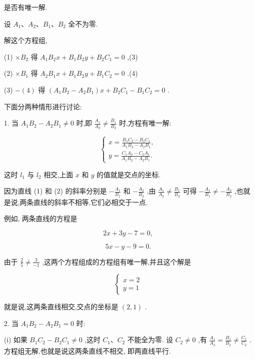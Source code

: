 \documentclass[lang=cn,newtx,10pt,scheme=chinese]{elegantbook}
\begin{document}
是否有唯一解.

设 \({A}_{1}\text{、}{A}_{2}\text{、}{B}_{1}\text{、}{B}_{2}\) 全不为零.

解这个方程组,

(1) \(\times {B}_{2}\) 得 \({A}_{1}{B}_{2}x + {B}_{1}{B}_{2}y + {B}_{2}{C}_{1} = 0\) ,(3)

(2) \(\times {B}_{1}\) 得 \({A}_{2}{B}_{1}x + {B}_{1}{B}_{2}y + {B}_{1}{C}_{2} = 0\) .(4)

(3) \(- \left( 4\right)\) 得 \(\left( {{A}_{1}{B}_{2} - {A}_{2}{B}_{1}}\right) x + {B}_{2}{C}_{1} - {B}_{1}{C}_{2} = 0\) .

下面分两种情形进行讨论:

1. 当 \({A}_{1}{B}_{2} - {A}_{2}{B}_{1} \neq 0\) 时,即 \(\frac{{A}_{1}}{{A}_{2}} \neq \frac{{B}_{1}}{{B}_{2}}\) 时,方程有唯一解:

\[
  \left\{ \begin{array}{l} x = \frac{{B}_{1}{C}_{2} - {B}_{2}{C}_{1}}{{A}_{1}{B}_{2} - {A}_{2}{B}_{1}}, \\ y = \frac{{C}_{1}{A}_{2} - {C}_{2}{A}_{1}}{{A}_{1}{B}_{2} - {A}_{2}{B}_{1}}. \end{array}\right.
\]

这时 \({l}_{1}\) 与 \({l}_{2}\) 相交,上面 \(x\) 和 \(y\) 的值就是交点的坐标.

因为直线 (1) 和 (2) 的斜率分别是 \(- \frac{{A}_{1}}{{B}_{1}}\) 和 \(- \frac{{A}_{2}}{{B}_{2}}\) ,由 \(\frac{{A}_{1}}{{A}_{2}} \neq \frac{{B}_{1}}{{B}_{2}}\) 可得 \(- \frac{{A}_{1}}{{B}_{1}} \neq - \frac{{A}_{2}}{{B}_{2}}\) ,也就是说,两条直线的斜率不相等,它们必相交于一点.

例如, 两条直线的方程是

\[
    {2x} + {3y} - 7 = 0,
\]

\[
    {5x} - y - 9 = 0.
\]

由于 \(\frac{2}{5} \neq \frac{3}{-1}\) ,这两个方程组成的方程组有唯一解,并且这个解是

\[
  \left\{ \begin{array}{l} x = 2 \\ y = 1 \end{array}\right.
\]

就是说,这两条直线相交,交点的坐标是 \(\left( {2,1}\right)\) .

2. 当 \({A}_{1}{B}_{2} - {A}_{2}{B}_{1} = 0\) 时:

(i) 如果 \({B}_{1}{C}_{2} - {B}_{2}{C}_{1} \neq 0\) ,这时 \({C}_{1}\text{、}{C}_{2}\) 不能全为零. 设 \({C}_{2} \neq 0\) ,有 \(\frac{{A}_{1}}{{A}_{2}} = \frac{{B}_{1}}{{B}_{2}} \neq \frac{{C}_{1}}{{C}_{2}}\) . 方程组无解,也就是说这两条直线不相交, 即两直线平行.
\end{document}
